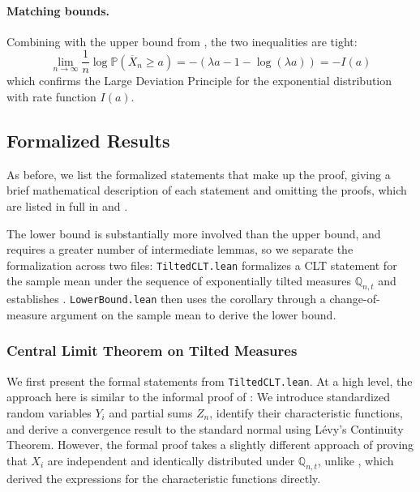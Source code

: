 \documentclass{article}
\renewcommand{\P}{\mathbb{P}}
\newcommand{\Q}{\mathbb{Q}}
\begin{document}
\paragraph{Matching bounds.}
Combining with the upper bound from , the two inequalities are tight:
\begin{equation}
  \lim_{n \to \infty} \frac{1}{n} \log \P(\overline{X}_n \ge a)
  = -(\lambda a - 1 - \log(\lambda a))
  = -I(a)
\end{equation}
which confirms the Large Deviation Principle for the exponential distribution with rate function $I(a)$.

\newpage
\subsection{Formalized Results}
\label{subsec:lower-formal}

As before, we list the formalized statements that make up the proof, giving a brief mathematical
description of each statement and omitting the proofs, which are listed in full in
 and .

The lower bound is substantially more involved than the upper bound, and requires a greater number of intermediate lemmas, so we separate the formalization across two files:
\texttt{TiltedCLT.lean} formalizes a CLT statement for the sample mean under the sequence of exponentially tilted measures $\Q_{n,t}$ and establishes
.
\texttt{LowerBound.lean} then uses the corollary through a change-of-measure argument on the sample
mean to derive the lower bound.

\subsubsection{Central Limit Theorem on Tilted Measures}
\label{subsubsec:tiltedclt-formal}

We first present the formal statements from \texttt{TiltedCLT.lean}. At a high level, the approach
here is similar to the informal proof of : We introduce standardized random
variables $Y_i$ and partial sums $Z_n$, identify their characteristic functions, and derive a
convergence result to the standard normal using L{\'e}vy's Continuity Theorem. However, the formal
proof takes a slightly different approach of proving that $X_i$ are independent and identically
distributed under $\Q_{n,t}$, unlike , which derived the expressions for the
characteristic functions directly.
\end{document}

